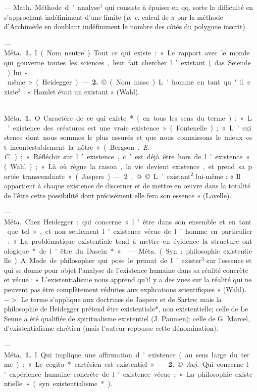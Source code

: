 \begin{itemize}[leftmargin=1cm, label=, itemsep=1pt]
 — \si{Math.} Méthode d’analyse$^1$ qui consiste à épuiser en qq.
sorte la difficulté en s’approchant
indéfiniment d’une limite ({\it p. e.} calcul
de $\pi$ par la méthode d’Archimède
en doublant indéfiniment le nombre
des côtés du polygone inscrit).

 — \si{Méta.} {\bf 1.} I (Nom neutre).
Tout ce qui existe : « Le rapport avec
le monde qui gouverne toutes les
sciences, leur fait chercher l’existant
(das Seiende) lui-même » (Heidegger). — {\bf 2.} © (Nom masc.) L'homme
en tant qu'il existe$^3$ : « Hamlet était
un existant » (Wahl).

 — \si{Méta.} {\bf 1.} O Caractère de
ce qui existe* (en tous les sens du
terme) : « L'existence des créatures
est une vraie existence. » (Fontenelle); « L’existence dont nous
sommes le plus assurés et que nous
connaissons le mieux est incontestablement la nôtre » (Bergson, {\it E. C.});
« Réfléchir sur l’existence, c’est déjà
être hors de l'existence » (Wahl);
« Là où règne la raison, la vie devient
existence, et prend sa portée transcendante » (Jaspers). — 2, @ ©
L’existant$^2$ lui-même : « Il appartient
à chaque existence de discerner et de
mettre en œuvre dans la totalité de
l'être cette possibilité dont précisément elle fera son essence » (Lavelle).

 — \si{Méta.} Chez Heidegger :
qui concerne « l’être dans son ensemble et en tant que tel », et non
seulement l'existence vécue de
l’homme en particulier : « La problématique existentiale tend à mettre
en évidence la structure ontologique* de l’être du Dasein* ».

 — \si{Méta.} (Syn. : philosophie existentielle). A. Mode de
philosopher qui pose le primat de
l’exister$^3$ sur l'essence et qui se
donne pour objet l’analyse de l’existence humaine dans sa réalité concrète et vécue : « L’existentialisme
nous apprend qu'il y a des vues sur
la réalité qui ne peuvent pas être
complètement réduites aux explications scientifiques » (Wahl). $->$
Le terme s'applique aux doctrines
de Jaspers et de Sartre; mais la
philosophie de Heidegger prétend
être existentiale*, non existentielle;
celle de Le Senne a été qualifiée de
spiritualisme existentiel (J. Paumen);
celle de G. Marcel, d’existentialisme
chrétien (mais l’auteur repousse
cette dénomination).

 — \si{Méta.} {\bf 1.} I Qui implique
une affirmation d’existence (au sens
large du terme) : « Le cogito* cartésien est existentiel ». — {\bf 2.} © {\it Auj.}
Qui concerne l'expérience humaine
concrète de l'existence vécue : « La
philosophie existentielle » (syn.
existentialisme*).


\end{itemize}
